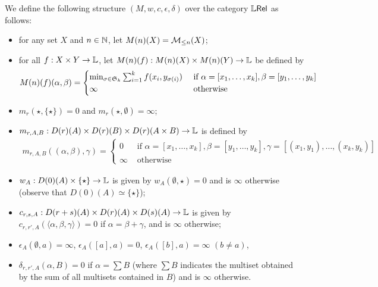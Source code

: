\begin{definition}
We define the following structure $(M,w,c,\epsilon,\delta)$ over the category $\mathbb{L} \mathsf{Rel}$ as follows:
\begin{itemize}
\item for any set $X$ and $n\in \mathbb{N}$, let $M(n)(X)=\mathcal{M}_{\leq n}(X)$;

\item for all $f: X\times Y\to \mathbb{L}$, let $M(n)(f): M(n)(X)\times M(n)(Y)\to \mathbb{L}$ be defined by 
\begin{align*}
M(n)(f)(\alpha,\beta)=
\begin{cases}
\min_{\sigma\in \mathfrak{S}_{k}}\sum_{i=1}^{k}f(x_{i},y_{\sigma(i)}) & 
\text{ if }\alpha=[x_{1},\dots, x_{k}], \beta=[y_{1},\dots, y_{k}]\\
\infty & \text{ otherwise}
\end{cases}
\end{align*}


\item $m_{r}(\star, \{\star\})=0$ and $m_{r}(\star, \emptyset)=\infty$;

\item $m_{r,A,B}: D(r)(A)\times D(r)(B)\times D(r)(A\times B)\to \mathbb{L}$ is defined by 
\begin{align*}
m_{r,A,B}((\alpha,\beta), \gamma)=
\begin{cases}
0 & \text{ if } \alpha=[x_{1},\dots, x_{k}], \beta=[y_{1},\dots, y_{k}], \gamma= [(x_{1},y_{1}),\dots, (x_{k},y_{k})]\\
\infty & \text{ otherwise}
\end{cases}
\end{align*}

\item $w_{A}:D(0)(A)\times \{\star\}\to \mathbb{L}$ is given by $w_{A}(\emptyset, \star)=0$ and is $\infty$ otherwise (observe that $D(0)(A)\simeq \{\star\}$);

\item $c_{r,s,A}: D(r+s)(A)\times D(r)(A)\times D(s)(A)\to \mathbb{L}$ is given by $c_{r,r',A}(\langle\alpha, \beta,\gamma\rangle)=0$ if $\alpha=\beta+\gamma$, and is $\infty$ otherwise;

\item $\epsilon_{A}(\emptyset, a)=\infty$, $\epsilon_{A}([a],a)=0$, $\epsilon_{A}([b],a)=\infty$ $(b\neq a)$,

\item $\delta_{r,r',A}(\alpha, B)=0$ if $\alpha= \sum B$ (where $\sum B$ indicates the multiset obtained by the sum of all multisets contained in $B$) and is $\infty$ otherwise.




\end{itemize}

\end{definition}



